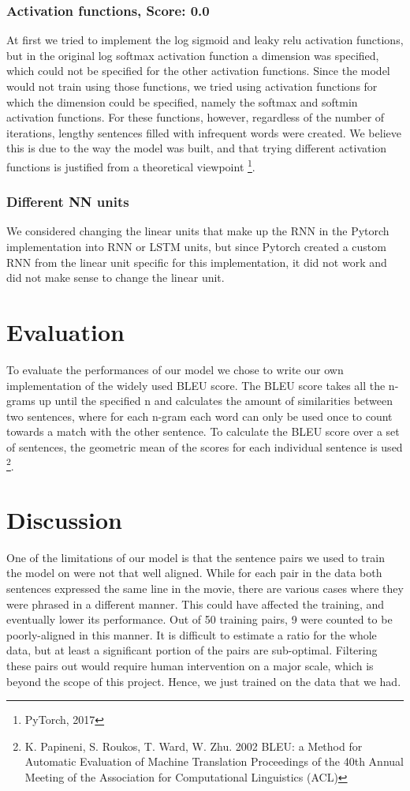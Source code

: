 \documentclass[11pt]{article}
\begin{document}
\subsubsection*{Activation functions, Score: 0.0}
At first we tried to implement the log sigmoid and leaky relu activation functions, but in the original log softmax activation function a dimension was specified, which could not be specified for the other activation functions. Since the model would not train using those functions, we tried using activation functions for which the dimension could be specified, namely the softmax and softmin activation functions. For these functions, however, regardless of the number of iterations, lengthy sentences filled with infrequent words were created. We believe this is due to the way the model was built, and that trying different activation functions is justified from a theoretical viewpoint \footnote[11]{PyTorch, 2017}.

\subsubsection*{Different NN units}
We considered changing the linear units that make up the RNN in the Pytorch implementation into RNN or LSTM units, but since Pytorch created a custom RNN from the linear unit specific for this implementation, it did not work and did not make sense to change the linear unit.

\section{Evaluation}
To evaluate the performances of our model we chose to write our own implementation of the widely used BLEU score. The BLEU score takes all the n-grams up until the specified n and calculates the amount of similarities between two sentences, where for each n-gram each word can only be used once to count towards a match with the other sentence. To calculate the BLEU score over a set of sentences, the geometric mean of the scores for each individual sentence is used \footnote[12]{K. Papineni, S. Roukos, T. Ward, W. Zhu. 2002 BLEU: a Method for Automatic Evaluation of Machine Translation Proceedings of the 40th Annual Meeting of the Association for Computational Linguistics (ACL)}.

\section{Discussion}
One of the limitations of our model is that the sentence pairs we used to train the model on were not that well aligned. While for each pair in the data both sentences expressed the same line in the movie, there are various cases where they were phrased in a different manner. This could have affected the training, and eventually lower its performance. Out of 50 training pairs, 9 were counted to be poorly-aligned in this manner. It is difficult to estimate a ratio for the whole data, but at least a significant portion of the pairs are sub-optimal. Filtering these pairs out would require human intervention on a major scale, which is beyond the scope of this project. Hence, we just trained on the data that we had.
\end{document}
